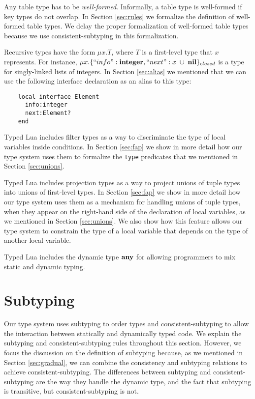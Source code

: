 Any table type has to be \emph{well-formed}.
Informally, a table type is well-formed if key types do not overlap.
In Section \ref{sec:rules} we formalize the definition of well-formed table types.
We delay the proper formalization of well-formed table types because we use
consistent-subtyping in this formalization.

Recursive types have the form $\mu x.T$,
where $T$ is a first-level type that $x$ represents.
For instance, $\mu x.\{``info":\mathbf{integer}, ``next":x \;\cup\; \mathbf{nil}\}_{closed}$
is a type for singly-linked lists of integers.
In Section \ref{sec:alias} we mentioned that we can use the following
interface declaration as an alias to this type:
\begin{verbatim}
    local interface Element
      info:integer
      next:Element?
    end
\end{verbatim}

Typed Lua includes filter types as a way to discriminate the type of local
variables inside conditions.
In Section \ref{sec:fap} we show in more detail how our type system
uses them to formalize the \texttt{type} predicates that we mentioned
in Section \ref{sec:unions}.

Typed Lua includes projection types as a way to project
unions of tuple types into unions of first-level types.
In Section \ref{sec:fap} we show in more detail how our type system
uses them as a mechanism for handling unions of tuple types,
when they appear on the right-hand side of the declaration of local variables,
as we mentioned in Section \ref{sec:unions}.
We also show how this feature allows our type system to constrain
the type of a local variable that depends on the type of another local variable.

Typed Lua includes the dynamic type $\mathbf{any}$ for allowing programmers
to mix static and dynamic typing.

\section{Subtyping}
\label{sec:subtyping}

Our type system uses subtyping \citep{cardelli1984smi,abadi1996to} to order
types and consistent-subtyping \citep{siek2007objects,siek2013mutable}
to allow the interaction between statically and dynamically typed code.
We explain the subtyping and consistent-subtyping rules throughout this section.
However, we focus the discussion on the definition of subtyping because,
as we mentioned in Section \ref{sec:gradual}, we can combine the
consistency and subtyping relations to achieve consistent-subtyping.
The differences between subtyping and consistent-subtyping are the way
they handle the dynamic type, and the fact that subtyping is transitive,
but consistent-subtyping is not.

